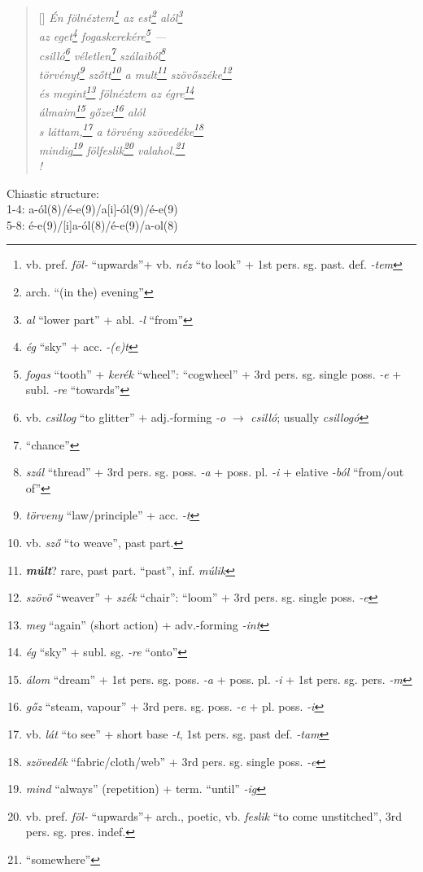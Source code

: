 \documentclass[a4paper,12pt,twoside,final]{book}
\begin{document}
\begin{verse}[\versewidth]
  \it
  Én fölnéztem\footnote{vb. pref. \emph{föl-} ``upwards''+ vb.
  \emph{néz} ``to look'' + 1st pers. sg. past. def. \emph{-tem}} az
  est\footnote{arch. ``(in the) evening''} alól\footnote{\emph{al}
  ``lower part'' + abl. \emph{-l} ``from''} \\
  az eget\footnote{\emph{ég} ``sky'' + acc. \emph{-(e)t}}
  fogaskerekére\footnote{\emph{fogas} ``tooth'' +
  \emph{kerék} ``wheel'': ``cogwheel'' + 3rd pers. sg. single
  poss. \emph{-e} + subl. \emph{-re} ``towards''} --- \\
  csilló\footnote{vb. \emph{csillog} ``to glitter'' +
  adj.-forming \emph{-o} $\rightarrow$
  \emph{csilló}; usually \emph{csillogó}}
  véletlen\footnote{``chance''} szálaiból\footnote{\emph{szál}
  ``thread'' + 3rd pers. sg. poss. \emph{-a} + poss. pl. \emph{-i} +
  elative \emph{-ból} ``from/out of''} \\
  törvényt\footnote{\emph{törveny} ``law/principle'' + acc. \emph{-t}}
  szőtt\footnote{vb. \emph{sző} ``to weave'', past part.} a
  mult\footnote{\textbf{\emph{múlt}}? rare, past part. ``past'',
  inf. \emph{múlik}}
  szövőszéke\footnote{\emph{szövő} ``weaver'' + \emph{szék} ``chair'':
  ``loom'' + 3rd pers. sg. single poss. \emph{-e}} \\
  és megint\footnote{\emph{meg} ``again'' (short action) +
  adv.-forming \emph{-int}} fölnéztem az égre\footnote{\emph{ég}
  ``sky'' + subl. sg. \emph{-re} ``onto''} \\
  álmaim\footnote{\emph{álom} ``dream'' +
  1st pers. sg. poss. \emph{-a} + poss. pl. \emph{-i} + 1st
  pers. sg. pers. \emph{-m}} gőzei\footnote{\emph{gőz} ``steam,
  vapour'' + 3rd pers. sg. poss. \emph{-e} + pl. poss. \emph{-i}} alól \\
  s láttam,\footnote{vb. \emph{lát} ``to see'' +
  short base \emph{-t}, 1st pers. sg. past def. \emph{-tam}} a törvény
  szövedéke\footnote{\emph{szövedék} ``fabric/cloth/web'' + 3rd
  pers. sg. single poss. \emph{-e}} \\
  mindig\footnote{\emph{mind} ``always'' (repetition) + term. ``until''
  \emph{-ig}} fölfeslik\footnote{vb. pref. \emph{föl-} ``upwards''+
  arch., poetic, vb.
  \emph{feslik} ``to come unstitched'', 3rd pers. sg. pres. indef.}
  valahol.\footnote{``somewhere''} \\!
\end{verse}

\noindent Chiastic structure: \\
1-4: a-ól(8)/é-e(9)/a[i]-ól(9)/é-e(9) \\
5-8: é-e(9)/[i]a-ól(8)/é-e(9)/a-ol(8)
\end{document}
